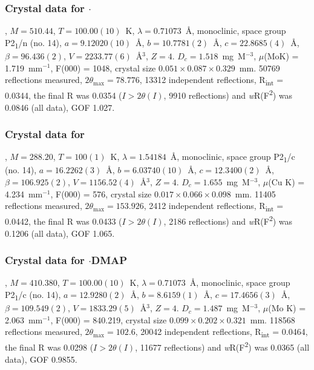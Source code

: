 \begin{refsection}
\subsubsection{Crystal data for \texorpdfstring{$\cdot$}{C25 H25 N3 O4 Se}}
, $M=510.44$, $T=100.00(10)$~K, $\lambda=0.71073$~\AA, monoclinic, space group P2\textsubscript{1}/n (no. 14), $a = 9.12020(10)$~\AA, $b = 10.7781(2)$~\AA, $c = 22.8685(4)$~\AA, $\beta = 96.436(2)$\degree, $V = 2233.77(6)$~\AA$^{3}$, $Z = 4$. $D_{c}= 1.518$~mg~M$^{-3}$, $\mu$(MoK\a) = 1.719~mm$^{-1}$, F(000) = 1048, crystal size $0.051 \times 0.087 \times 0.329$~mm. 50769 reflections measured, $2\theta_{\mathrm{max}}=78.776$\degree, 13312 independent reflections, R\textsubscript{int} = 0.0344, the final R was 0.0354 ($I > 2\theta(I)$, 9910 reflections) and \emph{w}R(F\textsuperscript{2}) was 0.0846 (all data), GOF 1.027.

\subsubsection{Crystal data for \texorpdfstring{}{C14 H11 N O Se}}
, $M=288.20$, $T=100(1)$~K, $\lambda=1.54184$~\AA, monoclinic, space group P2\textsubscript{1}/c (no. 14), $a = 16.2262(3)$~\AA, $b = 6.03740(10)$~\AA, $c = 12.3400(2)$~\AA, $\beta = 106.925(2)$\degree, $V = 1156.52(4)$~\AA$^{3}$, $Z = 4$. $D_{c}= 1.655$~mg~M$^{-3}$, $\mu$(Cu K\a) = 4.234~mm$^{-1}$, F(000) = 576, crystal size $0.017 \times 0.066 \times 0.098$~mm. 11405 reflections measured, $2\theta_{\mathrm{max}}=153.926$\degree, 2412 independent reflections, R\textsubscript{int} = 0.0442, the final R was 0.0433 ($I > 2\theta(I)$, 2186 reflections) and \emph{w}R(F\textsuperscript{2}) was 0.1206 (all data), GOF 1.065.

\subsubsection{Crystal data for \texorpdfstring{$\cdot$DMAP}{C21 H21 N3 O Se}}
, $M=410.380$, $T=100.00(10)$~K, $\lambda=0.71073$~\AA, monoclinic, space group P2\textsubscript{1}/c (no. 14), $a = 12.9280(2)$~\AA, $b = 8.6159(1)$~\AA, $c = 17.4656(3)$~\AA, $\beta = 109.549(2)$\degree, $V = 1833.29(5)$~\AA$^{3}$, $Z = 4$. $D_{c}= 1.487$~mg~M$^{-3}$, $\mu$(Mo K\a) = 2.063~mm$^{-1}$, F(000) = 840.219, crystal size $0.099 \times 0.202 \times 0.321$~mm. 118568 reflections measured, $2\theta_{\mathrm{max}}=102.6$\degree, 20042 independent reflections, R\textsubscript{int} = 0.0464, the final R was 0.0298 ($I > 2\theta(I)$, 11677 reflections) and \emph{w}R(F\textsuperscript{2}) was 0.0365 (all data), GOF 0.9855.


\end{refsection}
